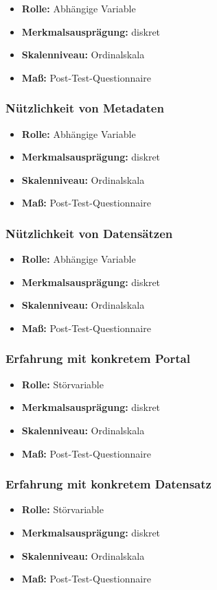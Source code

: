 \documentclass[a4paper,10pt,german,public]{INSOexpose}
\begin{document}
\begin{itemize}
    \item \textbf{Rolle:} Abhängige Variable
    \item \textbf{Merkmalsausprägung:} diskret
    \item \textbf{Skalenniveau:} Ordinalskala
    \item \textbf{Maß:} Post-Test-Questionnaire
\end{itemize}

\subsubsection{Nützlichkeit von Metadaten}

\begin{itemize}
    \item \textbf{Rolle:} Abhängige Variable
    \item \textbf{Merkmalsausprägung:} diskret
    \item \textbf{Skalenniveau:} Ordinalskala
    \item \textbf{Maß:} Post-Test-Questionnaire
\end{itemize}

\subsubsection{Nützlichkeit von Datensätzen}

\begin{itemize}
    \item \textbf{Rolle:} Abhängige Variable
    \item \textbf{Merkmalsausprägung:} diskret
    \item \textbf{Skalenniveau:} Ordinalskala
    \item \textbf{Maß:} Post-Test-Questionnaire
\end{itemize}

\subsubsection{Erfahrung mit konkretem Portal}

\begin{itemize}
    \item \textbf{Rolle:} Störvariable
    \item \textbf{Merkmalsausprägung:} diskret
    \item \textbf{Skalenniveau:} Ordinalskala
    \item \textbf{Maß:} Post-Test-Questionnaire
\end{itemize}

\subsubsection{Erfahrung mit konkretem Datensatz}

\begin{itemize}
    \item \textbf{Rolle:} Störvariable
    \item \textbf{Merkmalsausprägung:} diskret
    \item \textbf{Skalenniveau:} Ordinalskala
    \item \textbf{Maß:} Post-Test-Questionnaire
\end{itemize}

\printbibliography
\end{document}
